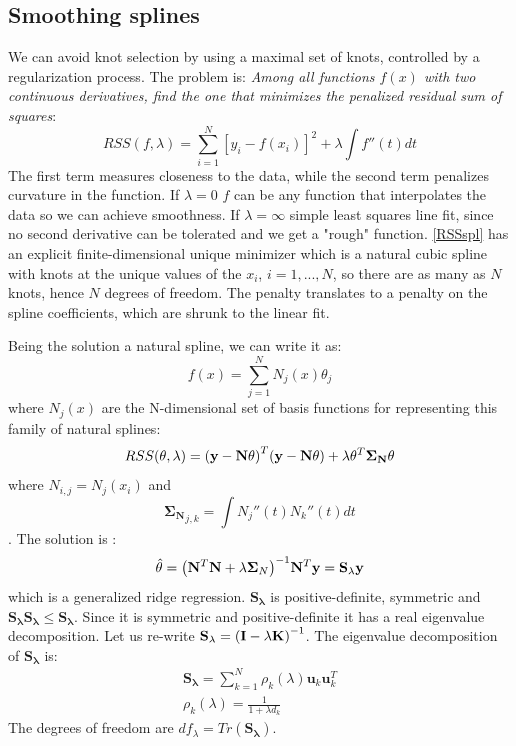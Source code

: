 \documentclass[12pt, letterpaper]{article}
\theoremstyle{definition}
\newcommand{\I}{\mathrm{\mathbf{I}}}
\newcommand{\y}{\mathbf{y}}
\DeclarePairedDelimiter\autobracket{(}{)}
\newcommand{\br}[1]{\autobracket*{#1}}
\begin{document}
\subsection{Smoothing splines}
We can avoid knot selection by using a maximal set of knots, controlled by a regularization process. The problem is: \textit{Among all functions $f(x)$ with two continuous derivatives, find the one that minimizes the penalized residual sum of squares}:
\begin{equation}
RSS(f,\lambda) = \sum_{i=1}^N \left[y_i - f(x_i)\right]^2 + \lambda \int f''(t) dt
\label{RSSspl}
\end{equation}
The first term measures closeness to the data, while the second term penalizes curvature in the function. If $\lambda=0$ $f$ can be any function that interpolates the data so we can achieve smoothness. If $\lambda=\infty$ simple least squares line fit, since no second derivative can be tolerated and we get a "rough" function.
\ref{RSSspl} has an explicit finite-dimensional unique minimizer which is a natural cubic spline with knots at the unique values of the $x_i$, $i = 1,...,N$, so there are as many as $N$ knots, hence $N$ degrees of freedom. The penalty translates to a penalty on the spline coefficients, which are shrunk to the linear fit.

Being the solution a natural spline, we can write it as:
\begin{equation}
f(x) = \sum_{j=1}^N N_j(x)\theta_j
\end{equation}
where $N_j(x)$ are the N-dimensional set of basis functions for representing this family of natural splines:
\begin{equation}
RSS(\theta, \lambda) = \br{\y - \mathbf{N}\theta}^T\br{\y - \mathbf{N}\theta}+\lambda \theta^T\mathbf{\Sigma_N}\theta
\end{equation}
where ${N}_{i,j} = N_j(x_i)$ and $${\mathbf{\Sigma_N}}_{j,k} = \int N_j''(t)N_k''(t)dt$$. The solution is :
\begin{equation}
\hat{\theta} = \br{\mathbf{N}^T\mathbf{N}+\lambda\mathbf{\Sigma}_N}^{-1}\mathbf{N}^T\y = \mathbf{S_\lambda} \y
\end{equation}
which is a generalized ridge regression. $\mathbf{S_\lambda}$ is positive-definite, symmetric and $\mathbf{S_\lambda}\mathbf{S_\lambda} \le \mathbf{S_\lambda}$. Since it is symmetric and positive-definite it has a real eigenvalue decomposition. Let us re-write $\mathbf{S_\lambda} = \br{\I-\lambda \mathbf{K}}^{-1}$.
The eigenvalue decomposition of $\mathbf{S_\lambda}$ is:
\begin{equation}
\begin{aligned}
\mathbf{S_\lambda} = \sum_{k=1}^N \rho_k(\lambda)\mathbf{u}_k\mathbf{u}_k^T\\
\rho_k(\lambda) = \frac{1}{1+\lambda d_k}
\end{aligned}
\end{equation}
The degrees of freedom are $df_\lambda = Tr(\mathbf{S_\lambda})$.
\end{document}
